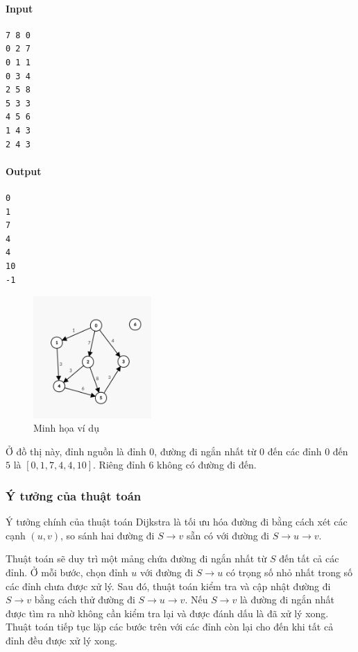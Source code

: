 \documentclass{article}
\begin{document}
\paragraph{Input}
\begin{lstlisting}
7 8 0
0 2 7
0 1 1
0 3 4
2 5 8
5 3 3
4 5 6
1 4 3
2 4 3
\end{lstlisting}
\paragraph{Output}
\begin{lstlisting}
0
1
7
4
4
10
-1
\end{lstlisting}

\begin{figure}[h]
    \centering
    \includegraphics[width=0.4\textwidth]{img/b7/dijkstra_1.png}
    \caption{Minh họa ví dụ}
\end{figure}

 Ở đồ thị này, đỉnh nguồn là đỉnh $0$, đường đi ngắn nhất từ $0$ đến các đỉnh $0$ đến $5$ là $[0, 1, 7, 4, 4, 10]$. Riêng đỉnh $6$ không có đường đi đến.

\subsubsection*{Ý tưởng của thuật toán}

Ý tưởng chính của thuật toán Dijkstra là tối ưu hóa đường đi bằng cách xét các cạnh $(u, v)$, so sánh hai đường đi $S \to v$ sẵn có với đường đi $S \to u \to v$.

Thuật toán sẽ duy trì một mảng chứa đường đi ngắn nhất từ $S$ đến tất cả các đỉnh. Ở mỗi bước, chọn đỉnh $u$ với đường đi $S \to u$ có trọng số nhỏ nhất trong số các đỉnh chưa được xử lý. Sau đó, thuật toán kiểm tra và cập nhật đường đi $S \to v$ bằng cách thử đường đi $S \to u \to v$. Nếu $S \to v$ là đường đi ngắn nhất được tìm ra nhờ không cần kiểm tra lại và được đánh dấu là đã xử lý xong. Thuật toán tiếp tục lặp các bước trên với các đỉnh còn lại cho đến khi tất cả đỉnh đều được xử lý xong.
\end{document}
